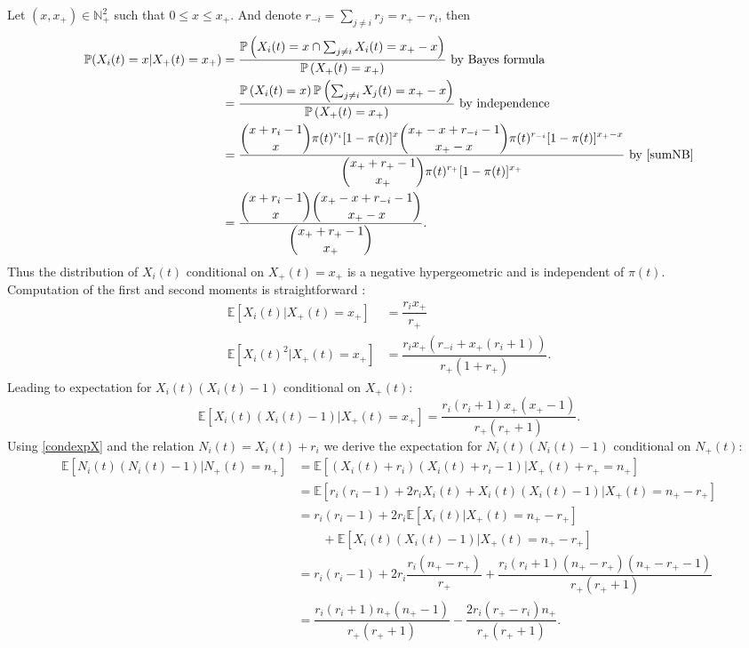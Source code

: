 \documentclass{article}
\newcommand{\pr}{{\mathbb{P}}}
\begin{document}
Let $(x,x_+) \in \mathbb{N}_+^2$ such that $0 \leq x \leq x_+$. And denote $ \displaystyle r_{-i}=\sum_{j \neq i} r_j=r_+-r_i$, then
\begin{align}
\pr( X_i(t)=x \vert X_+(t)=x_+ ) &=\dfrac{\pr\left( X_i(t)=x \cap \sum_{j \neq i} X_i(t)=x_+-x \right)}{\pr\left(X_+(t)=x_+\right)} \text{ by Bayes formula}\\
 &=\dfrac{\pr\left(X_i(t)=x\right) \pr\left(\sum_{j \neq i} X_j(t)=x_+-x\right)}{\pr\left(X_+(t)=x_+\right)} \text{ by independence}\\
 &=\dfrac{\displaystyle \binom{x+r_i-1}{x} \pi(t)^{r_i} [1-\pi(t)]^{x} \binom{x_+-x+r_{-i}-1}{x_+-x} \pi(t)^{r_{-i}} [1-\pi(t)]^{x_+-x} }{\displaystyle \binom{x_++r_+ -1}{x_+} \pi(t)^{r_+ } [1-\pi(t)]^{x_+}} \text{ by }\eqref{sumNB} \\
 &=\dfrac{\displaystyle \binom{x+r_i-1}{x} \binom{x_+-x+r_{-i}-1}{x_+-x}}{\displaystyle \binom{x_+ +r_+ -1}{x_+}}.
\end{align}
Thus the distribution of $X_i(t)$ conditional on $ X_+(t)=x_+$ is a negative hypergeometric and is independent of $\pi(t)$.\\
Computation of the first and second moments is straightforward \cite[p. 262]{johnson2005univariate}: 
\begin{align}
\mathbb{E} [ X_i(t) \vert X_+(t)=x_+ ] &=\dfrac{r_i x_+}{r_+ } \\
\mathbb{E} [ X_i(t)^2 \vert X_+(t)=x_+ ] &=\dfrac{r_i x_+ (r_{-i} +x_+ (r_i+1))}{r_+ (1+r_+ )}.
\end{align}
Leading to expectation for $X_i(t)(X_i(t)-1)$ conditional on $X_+(t)$:
\begin{equation}
 \mathbb{E} [ X_i(t)(X_i(t)-1) \vert X_+(t)=x_+ ] =\dfrac{r_i(r_i+1) x_+ ( x_+ -1 ) }{r_+ (r_+ +1 )}. \label{condexpX}
\end{equation}
Using \eqref{condexpX} and the relation $N_i(t)=X_i(t)+r_i$ we derive the expectation for $N_i(t)(N_i(t)-1)$ conditional on $N_+(t)$:
\begin{align}
 \mathbb{E} [ N_i(t)(N_i(t)-1) \vert N_+(t)=n_+ ] &= \mathbb{E} [ ( X_i(t)+r_i)(X_i(t)+r_i -1) \vert X_+(t)+ r_+ = n_+ ] \\
 &= \mathbb{E} [r_i(r_i-1) + 2r_i X_i(t) + X_i(t)(X_i(t)-1) \vert X_+(t)=n_+ - r_+ ]\\
 &= r_i(r_i-1) + 2 r_i \mathbb{E} [ X_i(t) \vert X_+(t)=n_+ - r_+ ]\\
 & \qquad + \mathbb{E} [X_i(t)(X_i(t)-1) \vert X_+(t)=n_+ - r_+ ]\\
  &= r_i(r_i-1) + 2 r_i \dfrac{r_i (n_+ - r_+)}{r_+ } + \dfrac{r_i(r_i+1) (n_+ - r_+) ( n_+ - r_+ -1 ) }{r_+ (r_+ +1 )}\\
 &=\dfrac{r_i(r_i+1) n_+ ( n_+ -1 ) }{r_+ (r_+ +1)} -\dfrac{2 r_{i} (r_+ - r_i) n_+ }{r_+ (r_+ +1)}. \label{condexpN}
\end{align}
\end{document}
